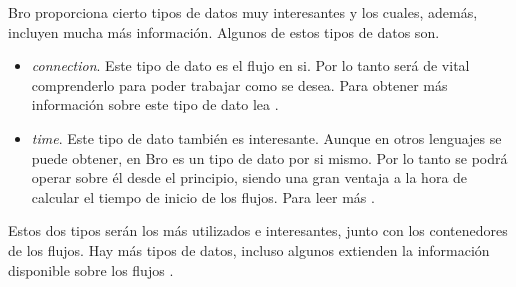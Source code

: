\intro Bro proporciona cierto tipos de datos muy interesantes y los cuales, además, incluyen mucha más información. 
Algunos de estos tipos de datos son. 
\begin{itemize}
\item \textit{connection}. \intro Este tipo de dato es el flujo en si. Por lo tanto será de vital comprenderlo para 
poder trabajar como se desea. Para obtener más información sobre este tipo de dato lea \cite{connectiontype}.
\item \textit{time}. \intro Este tipo de dato también es interesante. Aunque en otros lenguajes se puede obtener, 
en Bro es un tipo de dato por si mismo. Por lo tanto se podrá operar sobre él desde el principio, siendo una gran 
ventaja a la hora de calcular el tiempo de inicio de los flujos. Para leer más \cite{timetype}. 
\end{itemize}

\intro Estos dos tipos serán los más utilizados e interesantes, junto con los contenedores de los flujos. Hay más 
tipos de datos, incluso algunos extienden la información disponible sobre los flujos \cite{conntype}.
